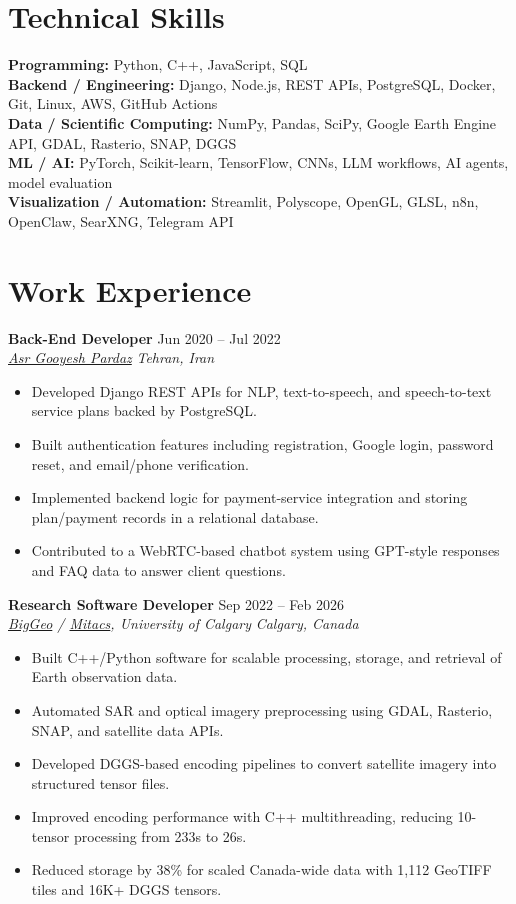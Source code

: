 \documentclass[a4paper,10pt]{article}
\newcommand{\resumeSubheading}[4]{
    \textbf{#1} \hfill #2 \\
    \textit{#3} \hfill \textit{#4}
}
\begin{document}
\section*{Technical Skills}

\textbf{Programming:} Python, C++, JavaScript, SQL \\
\textbf{Backend / Engineering:} Django, Node.js, REST APIs, PostgreSQL, Docker, Git, Linux, AWS, GitHub Actions \\
\textbf{Data / Scientific Computing:} NumPy, Pandas, SciPy, Google Earth Engine API, GDAL, Rasterio, SNAP, DGGS \\
\textbf{ML / AI:} PyTorch, Scikit-learn, TensorFlow, CNNs, LLM workflows, AI agents, model evaluation \\
\textbf{Visualization / Automation:} Streamlit, Polyscope, OpenGL, GLSL, n8n, OpenClaw, SearXNG, Telegram API


\section*{Work Experience}

\resumeSubheading
{Back-End Developer}
{Jun 2020 -- Jul 2022}
{\href{https://asr-gooyesh.com/en/}{Asr Gooyesh Pardaz}}
{Tehran, Iran}
\begin{itemize}[leftmargin=0.25in]
    \item Developed Django REST APIs for NLP, text-to-speech, and speech-to-text service plans backed by PostgreSQL.
    \item Built authentication features including registration, Google login, password reset, and email/phone verification.
    \item Implemented backend logic for payment-service integration and storing plan/payment records in a relational database.
    \item Contributed to a WebRTC-based chatbot system using GPT-style responses and FAQ data to answer client questions.
\end{itemize}

\resumeSubheading
{Research Software Developer}
{Sep 2022 -- Feb 2026}
{\href{https://biggeo.com}{BigGeo} / \href{https://www.mitacs.ca/}{Mitacs}, University of Calgary}
{Calgary, Canada}
\begin{itemize}[leftmargin=0.25in]
    \item Built C++/Python software for scalable processing, storage, and retrieval of Earth observation data.
    \item Automated SAR and optical imagery preprocessing using GDAL, Rasterio, SNAP, and satellite data APIs.
    \item Developed DGGS-based encoding pipelines to convert satellite imagery into structured tensor files.
    \item Improved encoding performance with C++ multithreading, reducing 10-tensor processing from 233s to 26s.
    \item Reduced storage by 38\% for scaled Canada-wide data with 1,112 GeoTIFF tiles and 16K+ DGGS tensors.
\end{itemize}
\end{document}

